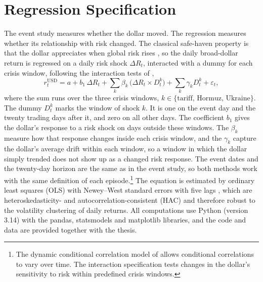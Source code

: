 \section{Regression Specification}
\label{sec:method_regression}

The event study measures whether the dollar moved. The regression measures whether its relationship with risk changed. The classical safe-haven property is that the dollar appreciates when global risk rises \parencite{habib_stracca_2012}, so the daily broad-dollar return is regressed on a daily risk shock $\Delta R_t$, interacted with a dummy for each crisis window, following the interaction tests of \textcite{baur_lucey_2010},
\begin{equation}
  \label{eq:safehaven_regression}
  r^{\text{USD}}_{t} = a + b_1\,\Delta R_t
     + \sum_{k}\beta_k\,\bigl(\Delta R_t \times D^{k}_t\bigr)
     + \sum_{k}\gamma_k D^{k}_t + \varepsilon_t,
\end{equation}
where the sum runs over the three crisis windows, $k\in\{\text{tariff},\,\text{Hormuz},\,\text{Ukraine}\}$. The dummy $D^{k}_t$ marks the window of shock $k$. It is one on the event day and the twenty trading days after it, and zero on all other days. The coefficient $b_1$ gives the dollar's response to a risk shock on days outside these windows. The $\beta_k$ measure how that response changes inside each crisis window, and the $\gamma_k$ capture the dollar's average drift within each window, so a window in which the dollar simply trended does not show up as a changed risk response. The event dates and the twenty-day horizon are the same as in the event study, so both methods work with the same definition of each episode.\footnote{The dynamic conditional correlation model of \textcite{engle_2002} allows conditional correlations to vary over time. The interaction specification tests changes in the dollar's sensitivity to risk within predefined crisis windows.} The equation is estimated by ordinary least squares (OLS) with Newey--West standard errors with five lags \parencite{newey_west_1987}, which are heteroskedasticity- and autocorrelation-consistent (HAC) and therefore robust to the volatility clustering of daily returns. All computations use Python (version 3.14) with the pandas, statsmodels and matplotlib libraries, and the code and data are provided together with the thesis.

